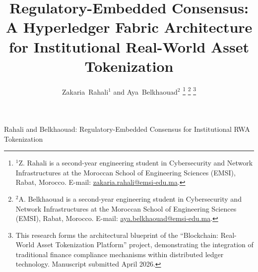 \documentclass[journal,10pt,twocolumn]{IEEEtran}
\begin{document}

\title{Regulatory-Embedded Consensus: A Hyperledger Fabric Architecture for Institutional Real-World Asset Tokenization}

\author{Zakaria~Rahali$^{1}$ and Aya~Belkhaouad$^{2}$%
\thanks{$^{1}$Z. Rahali is a second-year engineering student in Cybersecurity and Network Infrastructures at the Moroccan School of Engineering Sciences (EMSI), Rabat, Morocco. E-mail: \href{mailto:zakaria.rahali@emsi-edu.ma}{zakaria.rahali@emsi-edu.ma}.}%
\thanks{$^{2}$A. Belkhaouad is a second-year engineering student in Cybersecurity and Network Infrastructures at the Moroccan School of Engineering Sciences (EMSI), Rabat, Morocco. E-mail: \href{mailto:aya.belkhaouad@emsi-edu.ma}{aya.belkhaouad@emsi-edu.ma}.}%
\thanks{This research forms the architectural blueprint of the ``Blockchain: Real-World Asset Tokenization Platform'' project, demonstrating the integration of traditional finance compliance mechanisms within distributed ledger technology. Manuscript submitted April 2026.}}

%
{Rahali and Belkhaouad: Regulatory-Embedded Consensus for Institutional RWA Tokenization}

\maketitle
\end{document}
